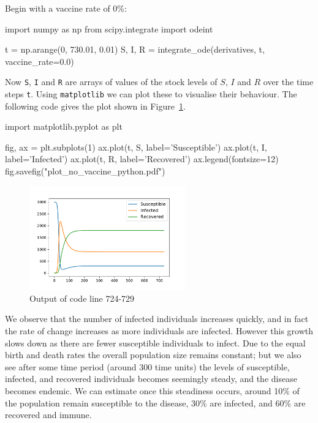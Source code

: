 Begin with a vaccine rate of 0\%:

\begin{pyin}
import numpy as np
from scipy.integrate import odeint

t = np.arange(0, 730.01, 0.01)
S, I, R = integrate_ode(derivatives, t, vaccine_rate=0.0)
\end{pyin}

Now \texttt{S}, \texttt{I} and \texttt{R}
are arrays of values of the stock levels of $S$, $I$ and $R$ over the time
steps \texttt{t}.
Using \texttt{matplotlib} we can plot these to visualise their
behaviour.
The following code gives the plot shown in Figure~\ref{fig:plot_no_vaccine}.


\begin{pyin-no-test}
import matplotlib.pyplot as plt

fig, ax = plt.subplots(1)
ax.plot(t, S, label='Susceptible')
ax.plot(t, I, label='Infected')
ax.plot(t, R, label='Recovered')
ax.legend(fontsize=12)
fig.savefig("plot_no_vaccine_python.pdf")
\end{pyin-no-test}


\begin{figure}
\begin{center}
\includegraphics[width=0.6\textwidth]{./assets/plot_no_vaccine_python.pdf}
\end{center}
\caption{Output of code line 724-729}
\label{fig:plot_no_vaccine}
\end{figure}

We observe that the number of infected individuals increases quickly, and in
fact the rate of change increases as more individuals are infected. However
this growth slows down as there are fewer susceptible individuals to infect. Due
to the equal birth and death rates the overall population size remains constant;
but we also see after some time period (around 300 time units) the levels of
susceptible, infected, and recovered individuals becomes seemingly steady, and
the disease becomes endemic. We can estimate once this steadiness occurs, around
10\% of the population remain susceptible to the disease, 30\% are infected, and
60\% are recovered and immune.

